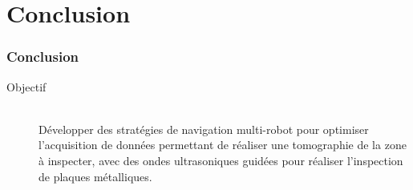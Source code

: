 \documentclass{beamer}
\begin{document}
	\section{Conclusion}
		\begin{frame}
			\frametitle{Conclusion}
			\begin{description}

				\item[Objectif] \hfill \\ Développer des stratégies de navigation multi-robot pour optimiser l'acquisition de données permettant de réaliser une tomographie de la zone à inspecter, avec des ondes ultrasoniques guidées pour réaliser l'inspection de plaques métalliques.
			\end{description}
		\end{frame}
\end{document}
